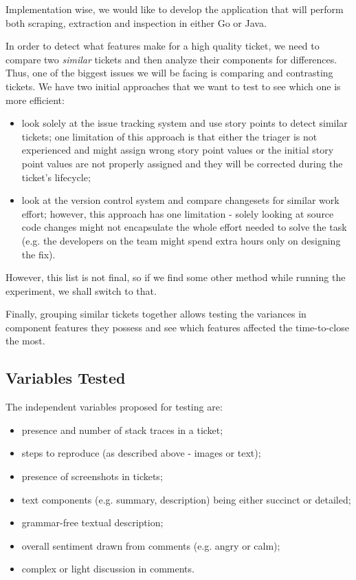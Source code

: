 \documentclass{mprop}
\begin{document}
Implementation wise, we would like to develop the application that will
perform both scraping, extraction and inspection in either Go or Java.

In order to detect what features make for a high quality ticket, we need 
to compare two \emph{similar} tickets and then analyze their components
for differences. Thus, one of the biggest issues we will be facing is 
comparing and contrasting tickets. We have two initial approaches
that we want to test to see which one is more efficient:
  \begin{itemize}
    \item look solely at the issue tracking system and use story points
      to detect similar tickets; one limitation of this approach is that
      either the triager is not experienced and might assign wrong story
      point values or the initial story point values are not properly
      assigned and they will be corrected during the ticket's lifecycle;
    \item look at the version control system and compare changesets for
      similar work effort; however, this approach has one limitation - 
      solely looking at source code changes might not encapsulate the
      whole effort needed to solve the task (e.g. the developers on the
      team might spend extra hours only on designing the fix).
  \end{itemize}
However, this list is not final, so if we find some other method 
while running the experiment, we shall switch to that.

Finally, grouping similar tickets together allows testing 
the variances in component features they possess and see which features
affected the time-to-close the most.

\subsection{Variables Tested}

The independent variables proposed for testing are:
  \begin{itemize}
    \item presence and number of stack traces in a ticket;
    \item steps to reproduce (as described above - images or text);
    \item presence of screenshots in tickets;
    \item text components (e.g. summary, description) being either 
      succinct or detailed;
    \item grammar-free textual description;
    \item overall sentiment drawn from comments (e.g. angry or calm);
    \item complex or light discussion in comments.
  \end{itemize}
\end{document}
